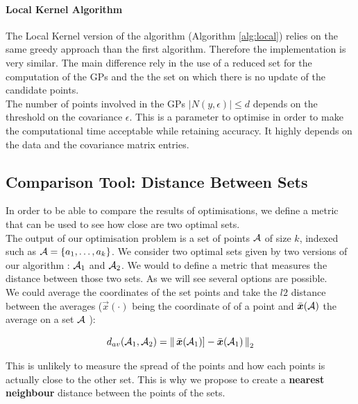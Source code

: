 \paragraph{Local Kernel Algorithm}

The Local Kernel version of the algorithm (Algorithm \ref{alg:local}) relies on the same greedy approach than the first algorithm. Therefore the implementation is very similar. The main difference rely in the use of a reduced set for the computation of the GPs and the the set on which there is no update of the candidate points. \\

The number of points involved in the GPs $|N(y,\epsilon)| \leq d $  depends on the threshold on the covariance $\epsilon$. This is a parameter to optimise in order to make the computational time acceptable while retaining accuracy. It highly depends on the data and the covariance matrix entries. 

 


\subsection{Comparison Tool: Distance Between Sets}

In order to be able to compare the results of optimisations, we define a metric that can be used to see how close are two optimal sets. \\

The output of our optimisation problem is a set of points $\mathcal{A}$ of size $k$, indexed such as $\mathcal{A} = \{a_1, \dots, a_k\}$. We consider two optimal sets given by two versions of our algorithm : $\mathcal{A}_1$ and $\mathcal{A}_2$. We would to define a metric that measures the distance between those two sets. As we will see several options are possible. \\

We could average the coordinates of the set points and take the $l2$ distance between the averages ($\vec{x}(\cdot)$ being the coordinate of of a point and $\bar{{\boldsymbol{{x}}}}(\mathcal{A})$ the average on a set $\mathcal{A}$  ):

\begin{equation}
	d_{av}(\mathcal{A}_1,\mathcal{A}_2) =  \left\lVert \,\bar{{\boldsymbol{{x}}}}(\mathcal{A}_1)] - \bar{{\boldsymbol{{x}}}}(\mathcal{A}_1)\, \right\rVert_2
\end{equation}

This is unlikely to measure the spread of the points and how each points is actually close to the other set. This is why we propose to create  a \textbf{nearest neighbour} distance between the points of the sets. \\

